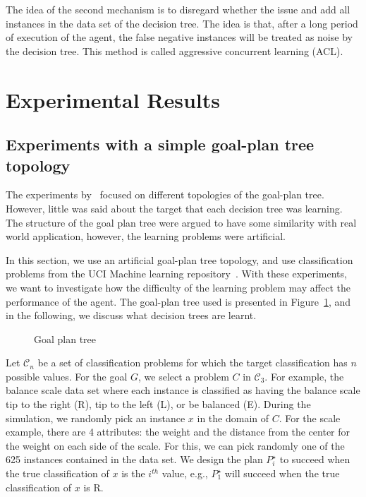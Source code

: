 \documentclass{article}
\newcommand{\C}{{\mathscr C}}
\begin{document}
 
The idea of the second mechanism is to disregard whether the issue and
add all instances in the data set of the decision tree. The idea is
that, after a long period of execution of the agent, the false
negative instances will be treated as noise by the decision tree. This
method is called aggressive concurrent learning (ACL).

\section{Experimental Results}

\subsection{Experiments with a simple goal-plan tree topology}

The experiments by~\cite{Singh10:Learning} focused on different
topologies of the goal-plan tree. However, little was said about the
target that each decision tree was learning.  The structure of the
goal plan tree were argued to have some similarity with real world
application, however, the learning problems were artificial. 

In this section, we use an artificial goal-plan tree topology, and use
classification problems from the UCI Machine learning
repository~\citep{MLR}. With these experiments, we want to investigate
how the difficulty of the learning problem may affect the performance
of the agent. The goal-plan tree used is presented in
Figure~\ref{fig:gptreeML}, and in the following, we discuss what
decision trees are learnt.

\begin{figure}[h]
\centerline{}
\caption{Goal plan tree}
\label{fig:gptreeML}
\end{figure}

Let $\C_n$ be a set of classification problems for which the target
classification has $n$ possible values.  For the goal $G$, we select a
problem $C$ in $\C_3$.  For example, the balance scale data set where
each instance is classified as having the balance scale tip to the
right (R), tip to the left (L), or be balanced (E).  During the
simulation, we randomly pick an instance $x$ in the domain of $C$.
For the scale example, there are 4 attributes: the weight and the
distance from the center for the weight on each side of the scale. For
this, we can pick randomly one of the 625 instances contained in the
data set.  We design the plan $P^\star_{i}$ to succeed when the true
classification of $x$ is the $i^{th}$ value, e.g., $P^\star_{1}$ will
succeed when the true classification of $x$ is R. 
\end{document}

